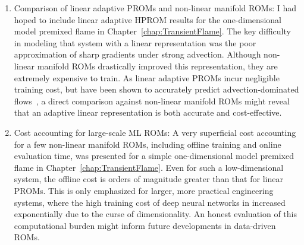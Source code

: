 \begin{enumerate}
    \item Comparison of linear adaptive PROMs and non-linear manifold ROMs: I had hoped to include linear adaptive HPROM results for the one-dimensional model premixed flame in Chapter~\ref{chap:TransientFlame}. The key difficulty in modeling that system with a linear representation was the poor approximation of sharp gradients under strong advection. Although non-linear manifold ROMs drastically improved this representation, they are extremely expensive to train. As linear adaptive PROMs incur negligible training cost, but have been shown to accurately predict advection-dominated flows~\cite{WayneIsaacTanUy2022}, a direct comparison against non-linear manifold ROMs might reveal that an adaptive linear representation is both accurate and cost-effective.
    \item Cost accounting for large-scale ML ROMs: A very superficial cost accounting for a few non-linear manifold ROMs, including offline training and online evaluation time, was presented for a simple one-dimensional model premixed flame in Chapter~\ref{chap:TransientFlame}. Even for such a low-dimensional system, the offline cost is orders of magnitude greater than that for linear PROMs. This is only emphasized for larger, more practical engineering systems, where the high training cost of deep neural networks in increased exponentially due to the curse of dimensionality. An honest evaluation of this computational burden might inform future developments in data-driven ROMs.
\end{enumerate}